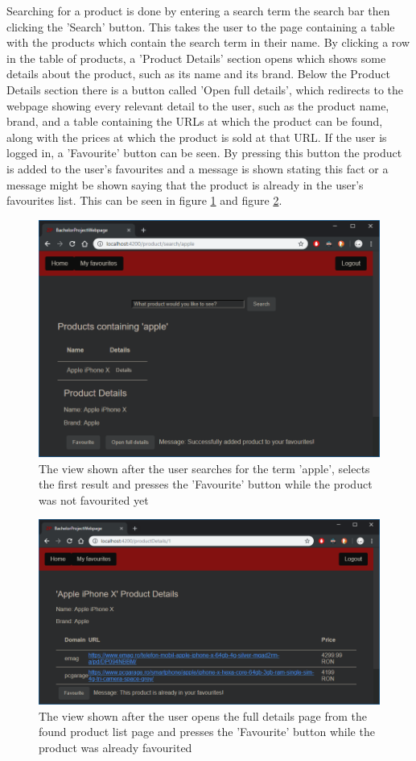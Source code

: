 \documentclass[12pt,a4paper,twoside]{report}
\begin{document}
Searching for a product is done by entering a search term the search bar then clicking the 'Search' button. This takes the user to the page containing a table with the products which contain the search term in their name. By clicking a row in the table of products, a 'Product Details' section opens which shows some details about the product, such as its name and its brand. Below the Product Details section there is a button called 'Open full details', which redirects to the webpage showing every relevant detail to the user, such as the product name, brand, and a table containing the URLs at which the product can be found, along with the prices at which the product is sold at that URL. If the user is logged in, a 'Favourite' button can be seen. By pressing this button the product is added to the user's favourites and a message is shown stating this fact or a message might be shown saying that the product is already in the user's favourites list. This can be seen in figure \ref{fig:web_page_product_search} and figure \ref{fig:web_page_product_details}.

\begin{figure}[ht]
  \centering
  \includegraphics[width=0.75\linewidth]{img/web_page_product_search.png}
  \caption[]{The view shown after the user searches for the term 'apple', selects the first result and presses the 'Favourite' button while the product was not favourited yet}
  \label{fig:web_page_product_search}
\end{figure}

\begin{figure}[ht]
  \centering
  \includegraphics[width=0.75\linewidth]{img/web_page_product_details.png}
  \caption[]{The view shown after the user opens the full details page from the found product list page and presses the 'Favourite' button while the product was already favourited}
  \label{fig:web_page_product_details}
\end{figure}
\end{document}
